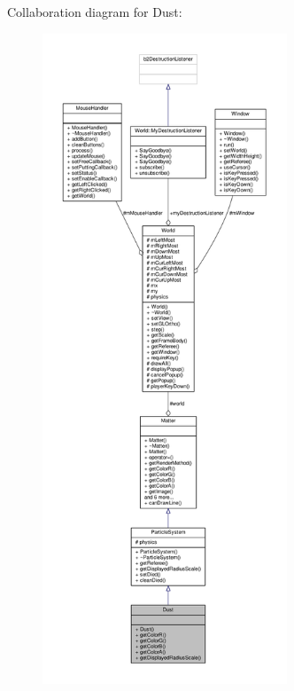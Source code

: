 Collaboration diagram for Dust\+:\nopagebreak
\begin{figure}[H]
\begin{center}
\leavevmode
\includegraphics[height=550pt]{classDust__coll__graph}
\end{center}
\end{figure}
